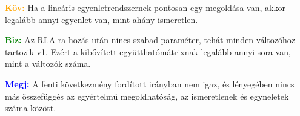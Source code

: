 \documentclass[../../szobeli.tex]{subfiles}
\begin{document}
\begin{itemize}
            \textcolor{orange}{\textbf{Köv:}} Ha a lineáris egyenletrendszernek pontosan egy megoldása van, akkor legalább annyi egyenlet van, mint ahány ismeretlen.

            \textcolor{green}{\textbf{Biz:}} Az RLA-ra hozás után nincs szabad paraméter, tehát minden változóhoz tartozik v1. Ezért a kibővített együtthatómátrixnak legalább annyi sora van, mint a változók száma.

            \textcolor{blue}{\textbf{Megj:}} A fenti következmény fordított irányban nem igaz, és lényegében nincs más összefüggés az egyértelmű megoldhatóság, az ismeretlenek és egyneletek száma között.
        
    \end{itemize}

\textcolor{red}{}

    
\end{document}
